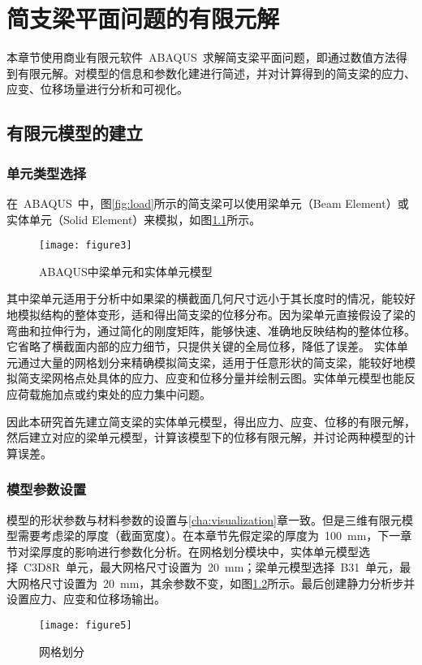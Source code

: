 \chapter{简支梁平面问题的有限元解}
\label{cha:FEAsolution}
本章节使用商业有限元软件~ABAQUS~求解简支梁平面问题，即通过数值方法得到有限元解。对模型的信息和参数化建进行简述，并对计算得到的简支梁的应力、应变、位移场量进行分析和可视化。
\section{有限元模型的建立}
\subsection{单元类型选择}
在~ABAQUS~中，图\ref{fig:load}所示的简支梁可以使用梁单元（Beam Element）或实体单元（Solid Element）来模拟\cite{souza2014finite,frangi2010finite}，如图\ref{fig:models}所示。
\begin{figure}[htbp]
    \centering
	\texttt{[image: figure3]}
    \caption{ABAQUS中梁单元和实体单元模型}
    \label{fig:models}
\end{figure}
其中梁单元适用于分析中如果梁的横截面几何尺寸远小于其长度时的情况，能较好地模拟结构的整体变形，适和得出简支梁的位移分布。因为梁单元直接假设了梁的弯曲和拉伸行为，通过简化的刚度矩阵，能够快速、准确地反映结构的整体位移。它省略了横截面内部的应力细节，只提供关键的全局位移，降低了误差。
实体单元通过大量的网格划分来精确模拟简支梁，适用于任意形状的简支梁，能较好地模拟简支梁网格点处具体的应力、应变和位移分量并绘制云图。实体单元模型也能反应荷载施加点或约束处的应力集中问题\cite{belytschko2013nonlinear}。

因此本研究首先建立简支梁的实体单元模型，得出应力、应变、位移的有限元解，然后建立对应的梁单元模型，计算该模型下的位移有限元解，并讨论两种模型的计算误差。
\subsection{模型参数设置}
模型的形状参数与材料参数的设置与\ref{cha:visualization}章一致。但是三维有限元模型需要考虑梁的厚度（截面宽度）。在本章节先假定梁的厚度为~100~mm，下一章节对梁厚度的影响进行参数化分析。在网格划分模块中，实体单元模型选择~C3D8R~单元，最大网格尺寸设置为~20~mm；梁单元模型选择~B31~单元，最大网格尺寸设置为~20~mm，其余参数不变\cite{radon2015study}，如图\ref{fig:mesh}所示。最后创建静力分析步并设置应力、应变和位移场输出\cite{liu2016review}。
\begin{figure}[htbp]
    \centering
	\texttt{[image: figure5]}
    \caption{网格划分}
    \label{fig:mesh}
\end{figure}
